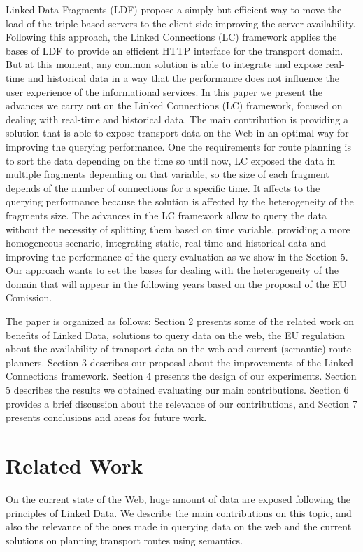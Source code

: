 \documentclass[sw]{iosart2x}
\begin{document}
Linked Data Fragments (LDF) propose a simply but efficient way to move the load of the triple-based servers to the client side improving the server availability. Following this approach, the Linked Connections (LC) framework applies the bases of LDF to provide an efficient HTTP interface for the transport domain. But at this moment, any common solution is able to integrate and expose real-time and historical data in a way that the performance does not influence the user experience of the informational services. In this paper we present the advances we carry out on the Linked Connections (LC) framework, focused on dealing with real-time and historical data. The main contribution is providing a solution that is able to expose transport data on the Web in an optimal way for improving the querying performance. One the requirements for route planning is to sort the data depending on the time so until now, LC exposed the data in multiple fragments depending on that variable, so the size of each fragment depends of the number of connections for a specific time. It affects to the querying performance because the solution is affected by the heterogeneity of the fragments size. The advances in the LC framework allow to query the data without the necessity of splitting them based on time variable, providing a more homogeneous scenario, integrating static, real-time and historical data and improving the performance of the query evaluation as we show in the Section 5. Our approach wants to set the bases for dealing with the heterogeneity of the domain that will appear in the following years based on the proposal of the EU Comission.

The paper is organized as follows: Section 2 presents some of the related work on benefits of Linked Data, solutions to query data on the web, the EU regulation about the availability of transport data on the web and current (semantic) route planners. Section 3 describes our proposal about the improvements of the Linked Connections framework. Section 4 presents the design of our experiments. Section 5 describes the results we obtained evaluating our main contributions. Section 6 provides a brief discussion about the relevance of our contributions, and Section 7 presents conclusions and areas for future work.


\section{Related Work}\label{related_work} %
On the current state of the Web, huge amount of data are exposed following the principles of Linked Data. We describe the main contributions on this topic, and also the relevance of the ones made in querying data on the web and the current solutions on planning transport routes using semantics.
\end{document}
